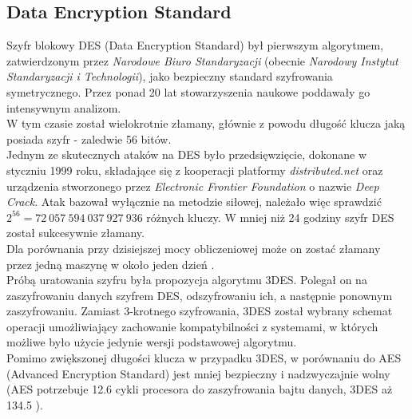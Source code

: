 \subsection{Data Encryption Standard}
Szyfr blokowy DES (Data Encryption Standard) był pierwszym algorytmem, zatwierdzonym przez \textit{Narodowe Biuro Standaryzacji} 
(obecnie \textit{Narodowy Instytut Standaryzacji i Technologii}), jako bezpieczny standard szyfrowania symetrycznego.
Przez ponad 20 lat stowarzyszenia naukowe poddawały go intensywnym analizom. \\
W tym czasie został wielokrotnie złamany, głównie z powodu długość klucza jaką posiada szyfr - zaledwie 56 bitów. \\
Jednym ze skutecznych ataków na DES było przedsięwzięcie, dokonane w styczniu 1999 roku, składające się z kooperacji platformy \textit{distributed.net} 
oraz urządzenia stworzonego przez \textit{Electronic Frontier Foundation} o nazwie \textit{Deep Crack}. 
Atak bazował wyłącznie na metodzie siłowej, należało więc sprawdzić $2^{56} = 72\ 057\ 594\ 037\ 927\ 936$ różnych kluczy.
W mniej niż 24 godziny szyfr DES został sukcesywnie złamany. \\
Dla porównania przy dzisiejszej mocy obliczeniowej może on zostać złamany przez jedną maszynę w około jeden dzień \cite{desday}. \\
Próbą uratowania szyfru była propozycja algorytmu 3DES. 
Polegał on na zaszyfrowaniu danych szyfrem DES, odszyfrowaniu ich, a następnie ponownym zaszyfrowaniu. 
Zamiast 3-krotnego szyfrowania, 3DES został wybrany schemat operacji umożliwiający zachowanie kompatybilności z systemami, w których możliwe było użycie jedynie wersji podstawowej algorytmu. \\
Pomimo zwiększonej długości klucza w przypadku 3DES, w porównaniu do AES (Advanced Encryption Standard) jest mniej bezpieczny i nadzwyczajnie wolny (AES potrzebuje 12.6 cykli procesora do zaszyfrowania bajtu danych, 3DES aż 134.5 \cite{crypto101}).


